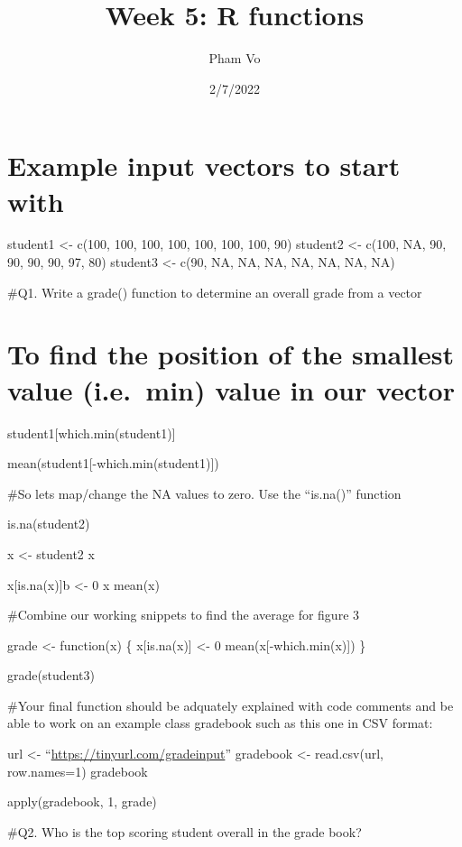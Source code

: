 \documentclass[
]{article}
\title{Week 5: R functions}
\author{Pham Vo}
\date{2/7/2022}
\begin{document}
\maketitle

\hypertarget{example-input-vectors-to-start-with}{%
\section{Example input vectors to start
with}\label{example-input-vectors-to-start-with}}

student1 \textless- c(100, 100, 100, 100, 100, 100, 100, 90) student2
\textless- c(100, NA, 90, 90, 90, 90, 97, 80) student3 \textless- c(90,
NA, NA, NA, NA, NA, NA, NA)

\#Q1. Write a grade() function to determine an overall grade from a
vector

\hypertarget{to-find-the-position-of-the-smallest-value-i.e.-min-value-in-our-vector}{%
\section{To find the position of the smallest value (i.e.~min) value in
our
vector}\label{to-find-the-position-of-the-smallest-value-i.e.-min-value-in-our-vector}}

student1{[}which.min(student1){]}

mean(student1{[}-which.min(student1){]})

\#So lets map/change the NA values to zero. Use the ``is.na()'' function

is.na(student2)

x \textless- student2 x

x{[}is.na(x){]}b \textless- 0 x mean(x)

\#Combine our working snippets to find the average for figure 3

grade \textless- function(x) \{ x{[}is.na(x){]} \textless- 0
mean(x{[}-which.min(x){]}) \}

grade(student3)

\#Your final function should be adquately explained with code comments
and be able to work on an example class gradebook such as this one in
CSV format:

url \textless- ``\url{https://tinyurl.com/gradeinput}'' gradebook
\textless- read.csv(url, row.names=1) gradebook

apply(gradebook, 1, grade)

\#Q2. Who is the top scoring student overall in the grade book?
\end{document}
